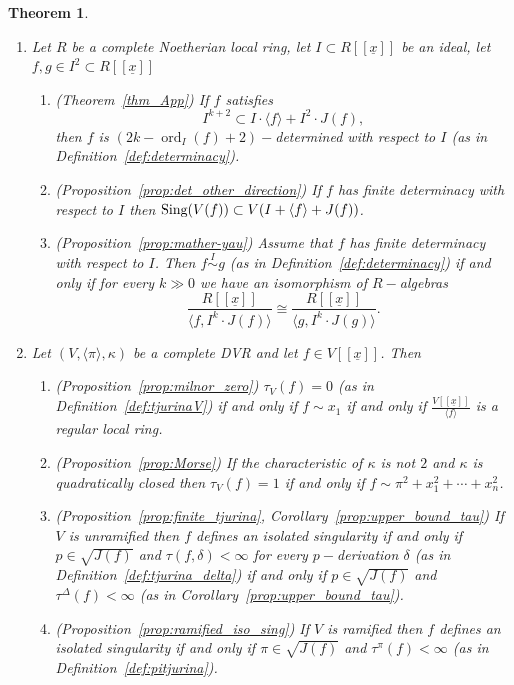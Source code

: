 \documentclass{article}
\newtheorem{theorem}{Theorem}
\DeclareMathOperator{\ord}{ord}
\newcommand{\equivd}{\overset{I}{\sim}}
\newcommand{\Vx}{V[[\underline{x}]]}
\numberwithin{theorem}{section}
\begin{document}
\begin{theorem}
\begin{enumerate}
    \item Let  $R$ be a complete Noetherian local ring, let $I \subset R[[\underline{x}]]$ be an ideal, let $f, g \in I^2 \subset R[[\underline{x}]]$
    \begin{enumerate}
        \item (Theorem~\ref{thm_App})  If $f$ satisfies
    \begin{equation*}
        I^{k+2} \subset I \cdot \langle f \rangle + I^2 \cdot J(f),
    \end{equation*}
      then $f$ is $\left(2k-\ord_I\left(f\right)+2\right)-$determined with respect to $I$ (as in Definition~\ref{def:determinacy}).
      \item (Proposition~\ref{prop:det_other_direction}) If $f$ has finite determinacy with respect to $I$ then $\textup{Sing}(V(f)) \subset V(I + \langle f \rangle + J(f))$.
      \item (Proposition~\ref{prop:mather-yau}) Assume that $f$ has finite determinacy with respect to $I$. Then $f \equivd g$ (as in Definition~\ref{def:determinacy}) if and only if for every $k\gg 0$ we have an isomorphism of $R-$algebras
    \begin{equation*}
        \frac{R[[\underline{x}]]}{\langle f, I^k\cdot  J(f) \rangle} \cong \frac{R[[\underline{x}]]}{\langle g, I^k\cdot  J(g)\rangle}.
    \end{equation*}
    \end{enumerate}
    \item Let $(V, \langle \pi\rangle, \kappa)$ be a complete DVR and let $f \in \Vx$. Then
    \begin{enumerate}
        \item (Proposition~\ref{prop:milnor_zero}) $\tau_V(f)=0$ (as in Definition~\ref{def:tjurinaV}) if and only if $f \sim x_1$  if and only if $\frac{\Vx}{\langle f \rangle}$ is a regular local ring. 
        \item (Proposition~\ref{prop:Morse}) If the characteristic of $\kappa$ is not $2$ and $\kappa$ is quadratically closed then $\tau_V(f)=1$ if and only if $f \sim \pi^2 + x_1^2 + \cdots +x_n^2$. 
        \item (Proposition~\ref{prop:finite_tjurina}, Corollary~\ref{prop:upper_bound_tau}) If $V$ is unramified then $f$ defines an isolated singularity if and only if $p \in \sqrt{J(f)}$ and $\tau(f, \delta) < \infty$ for every $p-$derivation $\delta$ (as in Definition~\ref{def:tjurina_delta}) if and only if $p \in \sqrt{J(f)}$ and $\tau^\Delta(f) < \infty$ (as in Corollary~\ref{prop:upper_bound_tau}). 
        \item (Proposition~\ref{prop:ramified_iso_sing}) If $V$ is ramified then $f$ defines an isolated singularity if and only if $\pi \in \sqrt{J(f)}$ and $\tau^\pi(f) <\infty$ (as in Definition~\ref{def:pitjurina}). 
    \end{enumerate}
\end{enumerate}
\end{theorem}
\end{document}
